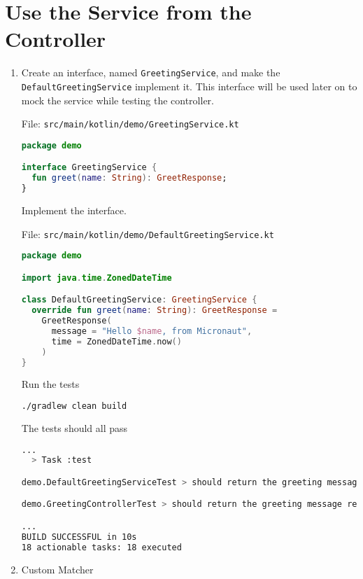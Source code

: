 \section{Use the Service from the Controller}\label{sec:service_and_controller}


\begin{enumerate}

\item Create an interface, named \texttt{GreetingService}, and make the \texttt{DefaultGreetingService} implement it.  This interface will be used later on to mock the service while testing the controller.

File: \texttt{src/main/kotlin/demo/GreetingService.kt}
\begin{lstlisting}[language=Kotlin]
package demo

interface GreetingService {
  fun greet(name: String): GreetResponse;
}
\end{lstlisting}

Implement the interface.

File: \texttt{src/main/kotlin/demo/DefaultGreetingService.kt}
\begin{lstlisting}[language=Kotlin]
package demo

import java.time.ZonedDateTime

class DefaultGreetingService: GreetingService {
  override fun greet(name: String): GreetResponse =
    GreetResponse(
      message = "Hello $name, from Micronaut",
      time = ZonedDateTime.now()
    )
}
\end{lstlisting}

Run the tests

\begin{lstlisting}[language=bash]
./gradlew clean build
\end{lstlisting}

The tests should all pass

\begin{lstlisting}[language=bash]
...
  > Task :test

demo.DefaultGreetingServiceTest > should return the greeting message for the given name PASSED

demo.GreetingControllerTest > should return the greeting message returned by the greeting service PASSED

...
BUILD SUCCESSFUL in 10s
18 actionable tasks: 18 executed
\end{lstlisting}

\item Custom Matcher


\end{enumerate}
